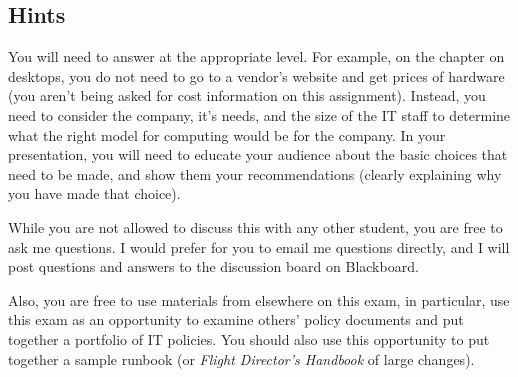 \documentclass{exam}
\begin{document}
\begin{questions}
\section*{Hints}

You will need to answer at the appropriate level.  For example, on the
chapter on desktops, you do not need to go to a vendor's website and get
prices of hardware (you aren't being asked for cost information on this
assignment).  Instead, you need to consider the company, it's needs, and
the size of the IT staff to determine what the right model for computing
would be for the company.  In your presentation, you will need to educate
your audience about the basic choices that need to be made, and show them
your recommendations (clearly explaining why you have made that choice).

While you are not allowed to discuss this with any other student, you are
free to ask me questions.  I would prefer for you to email me questions
directly, and I will post questions and answers to the discussion board
on Blackboard.

Also, you are free to use materials from elsewhere on this exam, in 
particular, use this exam as an opportunity to examine others' policy
documents and put together a portfolio of IT policies.  You should also
use this opportunity to put together a sample runbook (or 
\emph{Flight Director's Handbook} of large changes).

\end{questions}
\end{document}
